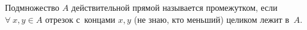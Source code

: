 
Подмножество $A$ действительной прямой называется промежутком, если
$\forall\  x,y\in A$ отрезок с~концами $x,y$ (не знаю, кто меньший) целиком лежит в~$A$.
